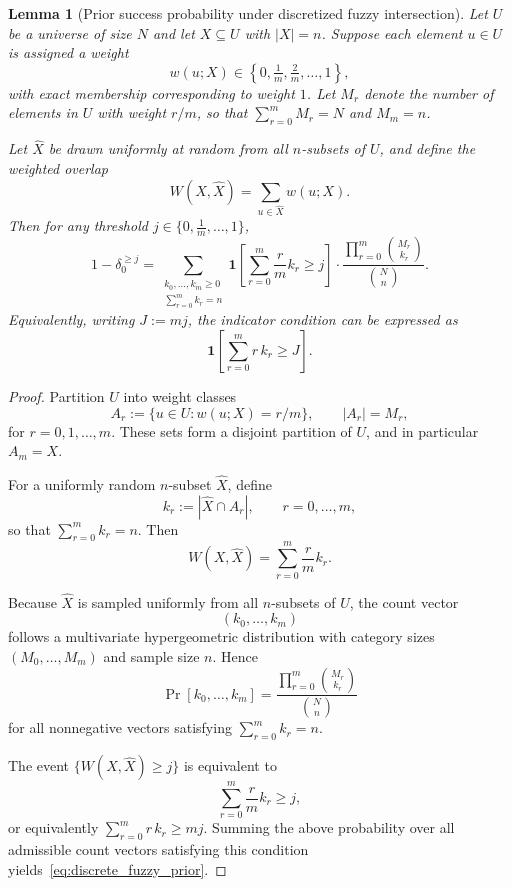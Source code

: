 \documentclass[letterpaper]{article} %
\newtheorem{lemma}[theorem]{Lemma}
\begin{document}
\begin{lemma}[Prior success probability under discretized fuzzy intersection]
Let $U$ be a universe of size $N$ and let $X \subseteq U$ with $|X| = n$.  
Suppose each element $u \in U$ is assigned a weight 
\[
w(u;X) \in \left\{0,\tfrac1m,\tfrac2m,\dots,1\right\},
\]
with exact membership corresponding to weight $1$.  
Let $M_r$ denote the number of elements in $U$ with weight $r/m$, so that 
$\sum_{r=0}^m M_r = N$ and $M_m = n$.

Let $\widehat{X}$ be drawn uniformly at random from all $n$-subsets of $U$, and define the weighted overlap
\[
W(X,\widehat{X}) = \sum_{u\in\widehat{X}} w(u;X).
\]
Then for any threshold $j \in \{0,\tfrac1m,\dots,1\}$,
\begin{equation}
\label{eq:discrete_fuzzy_prior}
1-\delta_0^{\ge j}
=
\sum_{\substack{k_0,\dots,k_m \ge 0\\ \sum_{r=0}^m k_r = n}}
\mathbf{1}\!\left[\sum_{r=0}^m \frac{r}{m}k_r \ge j\right]
\cdot
\frac{\prod_{r=0}^m \binom{M_r}{k_r}}{\binom{N}{n}}.
\end{equation}
Equivalently, writing $J := mj$, the indicator condition can be expressed as
\[
\mathbf{1}\!\left[\sum_{r=0}^m r\,k_r \ge J\right].
\]
\end{lemma}

\begin{proof}
Partition $U$ into weight classes
\[
A_r := \{u \in U : w(u;X) = r/m\}, 
\qquad |A_r| = M_r,
\]
for $r=0,1,\dots,m$.  
These sets form a disjoint partition of $U$, and in particular $A_m = X$.

For a uniformly random $n$-subset $\widehat{X}$, define
\[
k_r := |\widehat{X} \cap A_r|, \qquad r=0,\dots,m,
\]
so that $\sum_{r=0}^m k_r = n$.  
Then
\[
W(X,\widehat{X})
=
\sum_{r=0}^m \frac{r}{m} k_r.
\]

Because $\widehat{X}$ is sampled uniformly from all $n$-subsets of $U$, the count vector
\[
(k_0,\dots,k_m)
\]
follows a multivariate hypergeometric distribution with category sizes $(M_0,\dots,M_m)$ and sample size $n$. Hence
\[
\Pr[k_0,\dots,k_m]
=
\frac{\prod_{r=0}^m \binom{M_r}{k_r}}{\binom{N}{n}}
\]
for all nonnegative vectors satisfying $\sum_{r=0}^m k_r = n$.

The event $\{W(X,\widehat{X}) \ge j\}$ is equivalent to
\[
\sum_{r=0}^m \frac{r}{m}k_r \ge j,
\]
or equivalently $\sum_{r=0}^m r\,k_r \ge mj$.  
Summing the above probability over all admissible count vectors satisfying this condition yields~\eqref{eq:discrete_fuzzy_prior}.
\end{proof}
\end{document}

